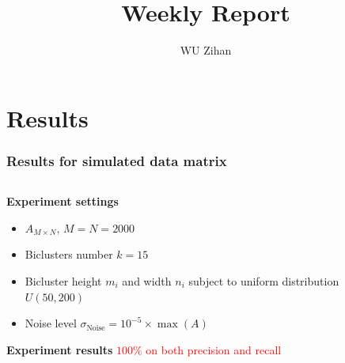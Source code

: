 \documentclass{beamer}
\title{Weekly Report}
\author{WU Zihan}
\begin{document}
\maketitle

\section{Results}
\begin{frame}
    \frametitle{Results for simulated data matrix}
    \begin{columns}[T]
        \begin{column}{0.5\textwidth}
            \centering
            \textbf{Experiment settings}
            \begin{itemize}
                \item $A_{M\times N}$, $M = N = 2000$
                \item Biclusters number $k = 15$
                \item Bicluster height $m_i$ and width $n_i$ subject to uniform distribution $U(50, 200)$
                \item Noise level $\sigma_{\text{Noise}} = 10^{-5} \times \max(A)$
            \end{itemize}
            \textbf{Experiment results}
    \textcolor{red}{$100\%$ on both precision and recall}
        \end{column}
        \begin{column}{0.5\textwidth}
            \vspace{-1cm}
            \centering
            

\end{column}
\end{columns}
\end{frame}
\end{document}
